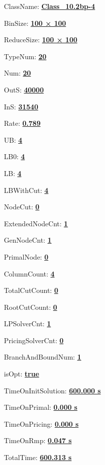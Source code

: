 \documentclass[11pt]{article}
\begin{document}
\pagestyle{empty}


ClassName: \underline{\textbf{Class_10.2bp-4}}
\par
BinSize: \underline{\textbf{100 × 100}}
\par
ReduceSize: \underline{\textbf{100 × 100}}
\par
TypeNum: \underline{\textbf{20}}
\par
Num: \underline{\textbf{20}}
\par
OutS: \underline{\textbf{40000}}
\par
InS: \underline{\textbf{31540}}
\par
Rate: \underline{\textbf{0.789}}
\par
UB: \underline{\textbf{4}}
\par
LB0: \underline{\textbf{4}}
\par
LB: \underline{\textbf{4}}
\par
LBWithCut: \underline{\textbf{4}}
\par
NodeCut: \underline{\textbf{0}}
\par
ExtendedNodeCnt: \underline{\textbf{1}}
\par
GenNodeCnt: \underline{\textbf{1}}
\par
PrimalNode: \underline{\textbf{0}}
\par
ColumnCount: \underline{\textbf{4}}
\par
TotalCutCount: \underline{\textbf{0}}
\par
RootCutCount: \underline{\textbf{0}}
\par
LPSolverCnt: \underline{\textbf{1}}
\par
PricingSolverCnt: \underline{\textbf{0}}
\par
BranchAndBoundNum: \underline{\textbf{1}}
\par
isOpt: \underline{\textbf{true}}
\par
TimeOnInitSolution: \underline{\textbf{600.000 s}}
\par
TimeOnPrimal: \underline{\textbf{0.000 s}}
\par
TimeOnPricing: \underline{\textbf{0.000 s}}
\par
TimeOnRmp: \underline{\textbf{0.047 s}}
\par
TotalTime: \underline{\textbf{600.313 s}}
\par
\newpage


\end{document}
